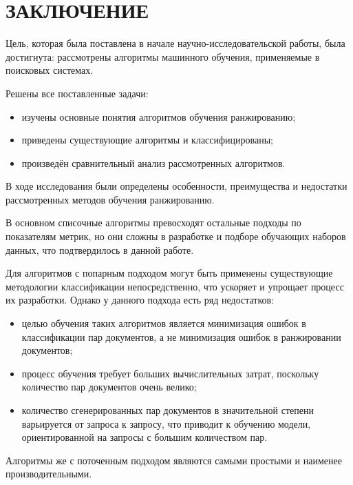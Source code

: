 \chapter*{ЗАКЛЮЧЕНИЕ}

Цель, которая была поставлена в начале научно-исследовательской работы, была достигнута: рассмотрены алгоритмы машинного обучения, применяемые в поисковых системах.

Решены все поставленные задачи:
\begin{itemize}[label=---]
	\item изучены основные понятия алгоритмов обучения ранжированию;
	\item приведены существующие алгоритмы и классифицированы;
	\item произведён сравнительный анализ рассмотренных алгоритмов.
\end{itemize}


В ходе исследования были определены особенности, преимущества и недостатки рассмотренных методов обучения ранжированию.

 В основном списочные алгоритмы превосходят остальные подходы по показателям метрик, но они сложны в разработке и подборе обучающих наборов данных, что подтвердилось в данной работе.

Для алгоритмов с попарным подходом могут быть применены существующие методологии классификации непосредственно, что ускоряет и упрощает процесс их разработки. Однако у данного подхода есть ряд недостатков:
\begin{itemize}[label=---]
	\item целью обучения таких алгоритмов является минимизация ошибок в классификации пар документов, а не минимизация ошибок в ранжировании документов;
	\item процесс обучения требует больших вычислительных затрат, поскольку количество пар документов очень велико;
	\item количество сгенерированных пар документов в значительной степени варьируется от запроса к запросу, что приводит к обучению модели, ориентированной на запросы с большим количеством пар.
\end{itemize}

Алгоритмы же с поточенным подходом являются самыми простыми и наименее производительными. 